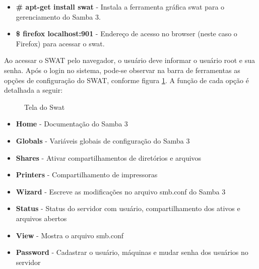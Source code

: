 \begin{itemize}
 \item \textbf{\# apt-get install swat} - Instala a ferramenta gráfica swat para o gerenciamento do Samba 3.
    \item \textbf{\$ firefox localhost:901} - Endereço de acesso no browser (neste caso o Firefox) para acessar o swat.
\end{itemize}

Ao acessar o SWAT pelo navegador, o usuário deve informar o usuário root e sua senha. Após o login no sistema, pode-se observar na barra de ferramentas as opções de configuração do SWAT, conforme figura \ref{swat}. A função de cada opção é detalhada a seguir:

\begin{figure}[ht]
   	\centering
   	\caption{Tela do Swat}
    \label{swat}
\end{figure}

\begin{itemize}
    \item \textbf{Home} - Documentação do Samba 3
    \item \textbf{Globals} - Variáveis globais de configuração do Samba 3
    \item \textbf{Shares} - Ativar compartilhamentos de diretórios e arquivos
    \item \textbf{Printers} - Compartilhamento de impressoras
    \item \textbf{Wizard} - Escreve as modificações no arquivo smb.conf do Samba 3
    \item \textbf{Status} - Status do servidor com usuário, compartilhamento dos ativos e arquivos abertos
    \item \textbf{View} - Mostra o arquivo smb.conf
    \item \textbf{Password} - Cadastrar o usuário, máquinas e mudar senha dos usuários no servidor
\end{itemize}

